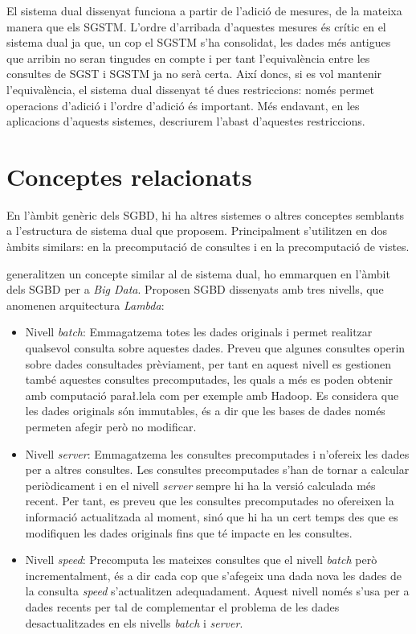 El sistema dual dissenyat funciona a partir de l'adició de mesures, de
la mateixa manera que els \gls{SGSTM}. L'ordre d'arribada d'aquestes
mesures és crític en el sistema dual ja que, un cop el \gls{SGSTM}
s'ha consolidat, les dades més antigues que arribin no seran tingudes
en compte i per tant l'equivalència entre les consultes de \gls{SGST}
i \gls{SGSTM} ja no serà certa. Així doncs, si es vol mantenir
l'equivalència, el sistema dual dissenyat té dues
restriccions: només permet operacions d'adició i l'ordre d'adició és
important.  Més endavant, en les aplicacions d'aquests sistemes,
descriurem l'abast d'aquestes restriccions.




\section{Conceptes relacionats}

En l'àmbit genèric dels \gls{SGBD}, hi ha altres sistemes o altres
conceptes semblants a l'estructura de sistema dual que
proposem. Principalment s'utilitzen en dos àmbits similars: en la
precomputació de consultes i en la precomputació de vistes.



\textcite{marz13:nosql13, marz14:bigdata} generalitzen un concepte
similar al de sistema dual, ho emmarquen en l'àmbit dels \gls{SGBD}
per a \emph{Big Data}.  Proposen \gls{SGBD} dissenyats amb tres
nivells, que anomenen arquitectura \emph{Lambda}:
\begin{itemize}
\item Nivell \emph{batch}: Emmagatzema totes les dades originals i
  permet realitzar qualsevol consulta sobre aquestes dades. Preveu que
  algunes consultes operin sobre dades consultades prèviament, per
  tant en aquest nivell es gestionen també aquestes consultes
  precomputades, les quals a més es poden obtenir amb computació
  para\l.lela com per exemple amb Hadoop. Es considera
  que les dades originals són immutables, és a dir que les bases de
  dades només permeten afegir però no modificar.

\item Nivell \emph{server}: Emmagatzema les consultes precomputades i
  n'ofereix les dades per a altres consultes. Les consultes
  precomputades s'han de tornar a calcular periòdicament i en el
  nivell \emph{server} sempre hi ha la versió calculada més
  recent. Per tant, es preveu que les consultes precomputades no
  ofereixen la informació actualitzada al moment, sinó que hi ha un
  cert temps des que es modifiquen les dades originals fins que té
  impacte en les consultes.

\item Nivell \emph{speed}: Precomputa les mateixes consultes que el
  nivell \emph{batch} però incrementalment, és a dir cada cop que
  s'afegeix una dada nova les dades de la consulta \emph{speed}
  s'actualitzen adequadament.  Aquest nivell només s'usa per a dades
  recents per tal de complementar el problema de les dades
  desactualitzades en els nivells \emph{batch} i \emph{server}.
\end{itemize}

